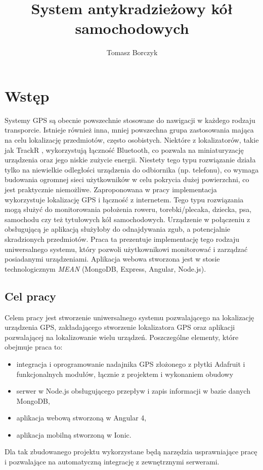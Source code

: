 \documentclass[eng,printmode]{mgr}
\title{System antykradzieżowy kół samochodowych}
\author{Tomasz Borczyk}
\begin{document}
\maketitle %
\tableofcontents


\chapter{Wstęp}
Systemy GPS są obecnie powszechnie stosowane do nawigacji w każdego rodzaju transporcie. Istnieje również inna, mniej powszechna grupa zastosowania mająca na celu lokalizację przedmiotów, często osobistych. Niektóre z lokalizatorów, takie jak TrackR \cite{TrackR}, wykorzystują łączność Bluetooth, co pozwala na miniaturyzację urządzenia oraz jego niskie zużycie energii. Niestety tego typu rozwiązanie działa tylko na niewielkie odległości urządzenia do odbiornika (np. telefonu), co wymaga budowania ogromnej sieci użytkowników w celu pokrycia dużej powierzchni, co jest praktycznie niemożliwe. Zaproponowana w pracy implementacja wykorzystuje lokalizację GPS i łączność z internetem. Tego typu rozwiązania mogą służyć do monitorowania położenia roweru, torebki/plecaka, dziecka, psa, samochodu czy też tytułowych kół samochodowych. Urządzenie w połączeniu z obsługującą je aplikacją służyłoby do odnajdywania zgub, a potencjalnie skradzionych przedmiotów. Praca ta prezentuje implementację tego rodzaju uniwersalnego systemu, który pozwoli użytkownikowi monitorować i zarządzać posiadanymi urządzeniami. Aplikacja webowa stworzona jest w stosie technologicznym \textit{MEAN} (MongoDB, Express, Angular, Node.js).

\section{Cel pracy}
Celem pracy jest stworzenie uniwersalnego systemu pozwalającego na lokalizację urządzenia GPS, zakładającego stworzenie lokalizatora GPS oraz aplikacji pozwalającej na lokalizowanie wielu urządzeń. Poszczególne elementy, które obejmuje praca to:
\begin{itemize}
\item integracja i oprogramowanie nadajnika GPS złożonego z płytki Adafruit i funkcjonalnych modułów, łącznie z projektem i wykonaniem obudowy
\item serwer w Node.js obsługującego przepływ i zapis informacji w bazie danych MongoDB,
\item aplikacja webową stworzoną w Angular 4,
\item aplikacja mobilną stworzoną w Ionic.
\end{itemize}
Dla tak zbudowanego projektu wykorzystane będą narzędzia usprawniające pracę i pozwalające na automatyczną integrację z zewnętrznymi serwerami.
\end{document}
